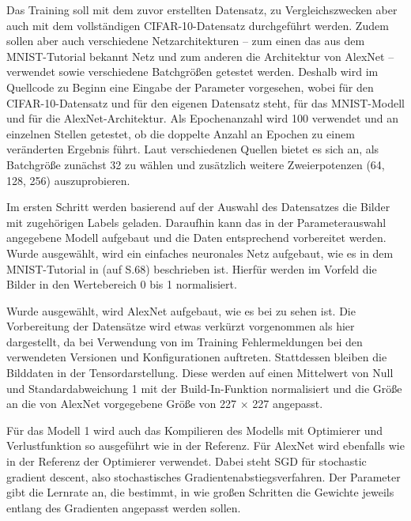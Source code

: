 Das Training soll mit dem zuvor erstellten Datensatz, zu Vergleichszwecken aber auch mit dem vollständigen CIFAR-10-Datensatz durchgeführt werden. Zudem sollen aber auch verschiedene Netzarchitekturen -- zum einen das aus dem MNIST-Tutorial bekannt Netz und zum anderen die Architektur von AlexNet -- verwendet sowie verschiedene Batchgrößen getestet werden. Deshalb wird im Quellcode zu Beginn eine Eingabe der Parameter vorgesehen, wobei  für den CIFAR-10-Datensatz und  für den eigenen Datensatz steht,  für das MNIST-Modell und  für die AlexNet-Architektur. Als Epochenanzahl wird 100 verwendet und an einzelnen Stellen getestet, ob die doppelte Anzahl an Epochen zu einem veränderten Ergebnis führt. Laut verschiedenen Quellen bietet es sich an, als Batchgröße zunächst 32 zu wählen und zusätzlich weitere Zweierpotenzen (64, 128, 256) auszuprobieren.

Im ersten Schritt werden basierend auf der Auswahl des Datensatzes die Bilder mit zugehörigen Labels geladen. Daraufhin kann das in der Parameterauswahl angegebene Modell aufgebaut und die Daten entsprechend vorbereitet werden. Wurde  ausgewählt, wird ein einfaches neuronales Netz aufgebaut, wie es in dem MNIST-Tutorial in \cite{Heise:2020} (auf S.68) beschrieben ist. Hierfür werden im Vorfeld die Bilder in den Wertebereich 0 bis 1 normalisiert.

Wurde  ausgewählt, wird AlexNet aufgebaut, wie es bei \cite{Alake:2020} zu sehen ist. Die Vorbereitung der Datensätze wird etwas verkürzt vorgenommen als hier dargestellt, da bei Verwendung von  im Training Fehlermeldungen bei den verwendeten Versionen und Konfigurationen auftreten. Stattdessen bleiben die Bilddaten in der Tensordarstellung. Diese werden auf einen Mittelwert von Null und Standardabweichung 1 mit der Build-In-Funktion  normalisiert und die Größe an die von AlexNet vorgegebene Größe von 227 $\times$ 227 angepasst.

Für das Modell 1 wird auch das Kompilieren des Modells mit Optimierer und Verlustfunktion so ausgeführt wie in der Referenz. Für AlexNet wird ebenfalls wie in der Referenz der Optimierer  verwendet. Dabei steht SGD für \glqq stochastic gradient descent\grqq, also stochastisches Gradientenabstiegsverfahren. Der Parameter  gibt die Lernrate an, die bestimmt, in wie großen Schritten die Gewichte jeweils entlang des Gradienten angepasst werden sollen.

